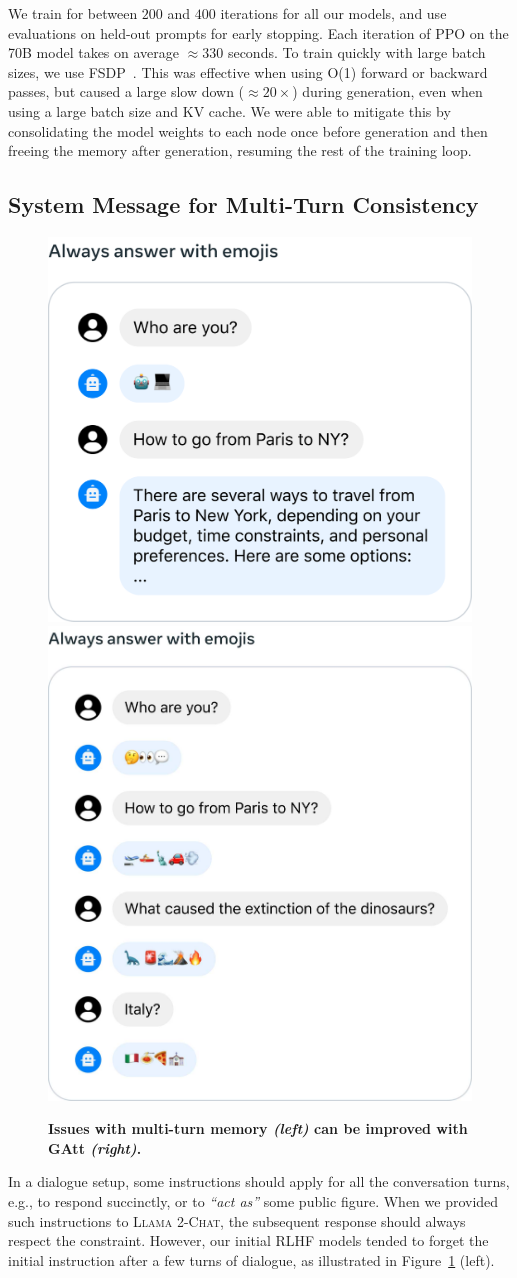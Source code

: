 \documentclass{article}
\newcommand{\modelname}{\textsc{Llama 2-Chat}\xspace}
\begin{document}
We train for between $200$ and $400$ iterations for all our models, and use evaluations on held-out prompts for early stopping. Each iteration of PPO on the 70B model takes on average $\approx 330$ seconds. To train quickly with large batch sizes, we use FSDP~\citep{zhao2023fsdp}. This was effective when using O(1) forward or backward passes, but caused a large slow down ($\approx 20\times$) during generation, even when using a large batch size and KV cache. We were able to mitigate this by consolidating the model weights to each node once before generation and then freeing the memory after generation, resuming the rest of the training loop.


\subsection{System Message for Multi-Turn Consistency}
\label{subsec:gatt}

\begin{figure}
    \centering
    \includegraphics[width=0.45 \linewidth,valign=t]{img/system_emojis_fail.pdf}
    \includegraphics[width=0.40 \linewidth,valign=t]{img/system_emojis.pdf}
    \caption{\textbf{Issues with multi-turn memory \textit{(left)} can be improved with GAtt \textit{(right)}.}}
    \label{fig:GAtt_chat_comparison}
\end{figure}

In a dialogue setup, some instructions should apply for all the conversation turns, e.g., to respond succinctly, or to \textit{``act as''} some public figure. When we provided such instructions to \modelname, the subsequent response should always respect the constraint. However, our initial RLHF models tended to forget the initial instruction after a few turns of dialogue, as illustrated in Figure~\ref{fig:GAtt_chat_comparison} (left). 
\end{document}
